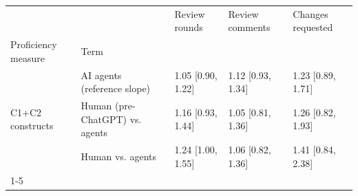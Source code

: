 \begin{tabular}{lllll}
\toprule
 &  & Review rounds & Review comments & Changes requested \\
Proficiency measure & Term &  &  &  \\
\midrule
\multirow[t]{3}{*}{C1+C2 constructs} & AI agents (reference slope) & 1.05 [0.90, 1.22] & 1.12 [0.93, 1.34] & 1.23 [0.89, 1.71] \\
 & Human (pre-ChatGPT) vs. agents & 1.16 [0.93, 1.44] & 1.05 [0.81, 1.36] & 1.26 [0.82, 1.93] \\
 & Human vs. agents & 1.24 [1.00, 1.55] & 1.06 [0.82, 1.36] & 1.41 [0.84, 2.38] \\
\cline{1-5}
\bottomrule
\end{tabular}
